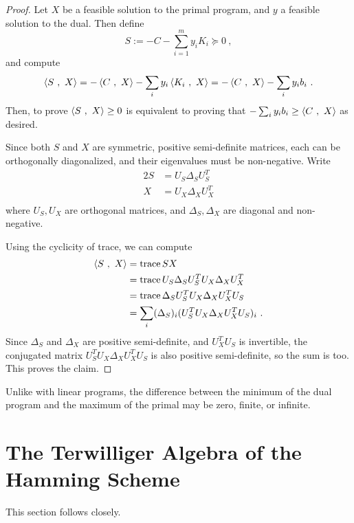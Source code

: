 \documentclass{report}
\begin{document}
    \begin{proof}
      Let $X$ be a feasible solution to the primal program, and $y$ a feasible
      solution to the dual.  Then define
      $$
        S := -C - \sum_{i=1}^m y_i K_i \succeq 0 \ ,
      $$
      and compute
      $$
        \left\langle  S \ , \ X  \right\rangle
        = -\left\langle  C \ , \ X  \right\rangle - \sum_i y_i \left\langle  K_i \ , \ X  \right\rangle
        = -\left\langle  C \ , \ X  \right\rangle - \sum_i y_i b_i \ .
      $$
      Then, to prove $\left\langle  S \ , \ X  \right\rangle \geq 0$ is equivalent to proving that
      $-\sum_i y_i b_i \geq \left\langle  C \ , \ X  \right\rangle$ as desired.

      Since both $S$ and $X$ are symmetric, positive semi-definite matrices,
      each can be orthogonally diagonalized, and their eigenvalues must be
      non-negative.  Write
      \begin{alignat*}{2}
        S &= U_S \Delta_S U_S^T \\
        X &= U_X \Delta_X U_X^T \\
      \end{alignat*}
      where $U_S, U_X$ are orthogonal matrices, and $\Delta_S, \Delta_X$ are
      diagonal and non-negative.

      Using the cyclicity of trace, we can compute
      \begin{alignat*}{2}
        \left\langle  S \ , \ X  \right\rangle &= \operatorname{trace} SX \\
        &= \operatorname{trace} U_S \Delta_S U_S^T U_X \Delta_X U_X^T \\
        &= \operatorname{trace} \Delta_S U_S^T U_X \Delta_X U_X^T U_S \\
        &= \sum_i (\Delta_S)_i (U_S^T U_X \Delta_X U_X^T U_S)_i \ .
      \end{alignat*}
      Since $\Delta_S$ and $\Delta_X$ are positive semi-definite, and $U_X^T
      U_S$ is invertible, the conjugated matrix $U_S^T U_X \Delta_X U_X^T U_S$
      is also positive semi-definite, so the sum is too.  This proves the claim.
    \end{proof}

    Unlike with linear programs, the difference between the minimum of the dual
    program and the maximum of the primal may be zero, finite, or infinite.

  \section{The Terwilliger Algebra of the Hamming
    Scheme}\label{sec:SDP-bound:terwilliger}

    This section follows \cite[Subsection I. A]{schrijver} closely.
\end{document}
